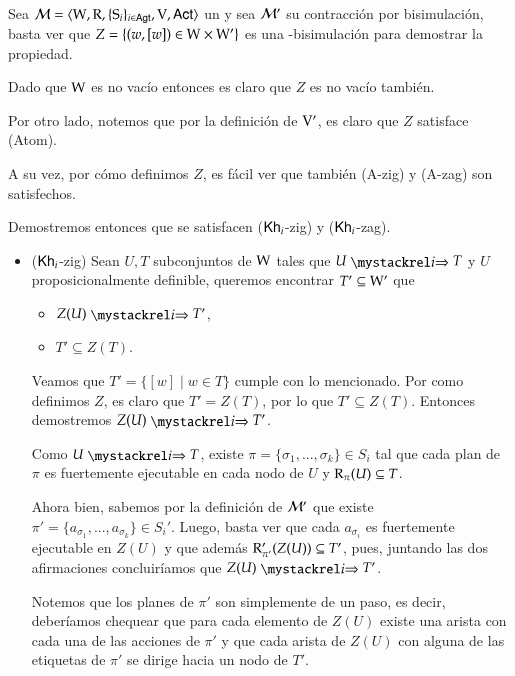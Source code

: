 \begin{demostracion}
    Sea $\mathcal{M}=\langle \mathrm{W},\mathrm{R},\{ \mathrm{S}_i \}_{i \in {\rm \sf Agt}},\mathrm{V},{\rm \sf Act} \rangle$ un \ults
    y sea $\mathcal{M}'$ su contracción por bisimulación, basta ver que $Z = \{(w,[w]) \in \mathrm{W} \times\mathrm{W}'\}$ es una \KHilogic-bisimulación para demostrar la propiedad.

    Dado que $\mathrm{W}$ es no vacío entonces es claro que $Z$ es no vacío también.

    Por otro lado, notemos que por la definición de $\mathrm{V}'$, es claro que $Z$ satisface (Atom).

    A su vez, por cómo definimos $Z$, es fácil ver que también (A-zig) y (A-zag) son satisfechos.
    
    Demostremos entonces que se satisfacen ($\mathsf{Kh}_i$-zig) y ($\mathsf{Kh}_i$-zag).

    \begin{itemize}
        \item ($\mathsf{Kh}_i$-zig) Sean $U, T$ subconjuntos de $\mathrm{W}$ tales que $U \ultsExecAgi T$ y $U$ proposicionalmente definible, queremos encontrar $T' \subseteq \mathrm{W}'$ que

        \begin{multicols}{2}
            \begin{itemize}
                \item $Z(U) \ultsExecAgi T'$, 
                \item $T' \subseteq Z(T)$.
            \end{itemize}
        \end{multicols}

        Veamos que $T' = \{ [w] \mid w \in T\}$ cumple con lo mencionado. Por como definimos $Z$, es claro que $T'  = Z(T)$, por lo que $T' \subseteq Z(T)$. Entonces demostremos $Z(U) \ultsExecAgi T'$.


        Como $U \ultsExecAgi T$, existe $\pi = \{\sigma_1,...,\sigma_k\} \in S_i$ tal que cada plan de $\pi$ es fuertemente ejecutable en cada nodo de $U$ y $\mathrm{R}_\pi(U) \subseteq T$. 

        Ahora bien, sabemos por la definición de $\mathcal{M}'$ que existe $\pi' =\{a_{\sigma_1},...,a_{\sigma_k}\} \in S_i'$. Luego, basta ver que cada $a_{\sigma_i}$ es fuertemente ejecutable en $Z(U)$ y que además $\mathrm{R}'_{\pi'}(Z(U)) \subseteq T'$, pues, juntando las dos afirmaciones concluiríamos que $Z(U) \ultsExecAgi T'$.


        Notemos que los planes de $\pi'$ son simplemente de un paso, es decir, deberíamos chequear que para cada elemento de $Z(U)$ existe una arista con cada una de las acciones de $\pi'$ y que cada arista de $Z(U)$ con alguna de las etiquetas de $\pi'$ se dirige hacia un nodo de $T'$. 


\end{itemize}
\end{demostracion}

